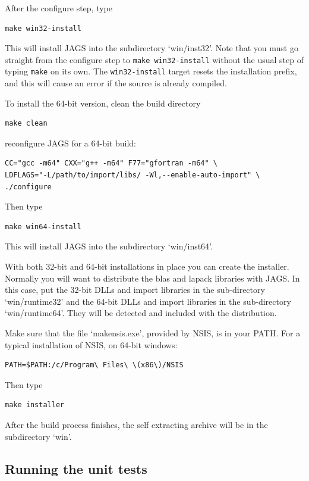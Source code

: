 \documentclass[11pt, a4paper, titlepage]{article}
\newcommand{\file}[1]{{`\normalfont\textsf{#1}'}}
\begin{document}
After the configure step, type
\begin{verbatim}
make win32-install
\end{verbatim}
This will install JAGS into the subdirectory \file{win/inst32}.
Note that you must go straight from the configure step to \texttt{make
  win32-install} without the usual step of typing \texttt{make} on
its own.  The \texttt{win32-install} target resets the installation
prefix, and this will cause an error if the source is already
compiled.

To install the 64-bit version, clean the build directory 
\begin{verbatim}
make clean 
\end{verbatim}
reconfigure JAGS for a 64-bit build:
\begin{verbatim}
CC="gcc -m64" CXX="g++ -m64" F77="gfortran -m64" \
LDFLAGS="-L/path/to/import/libs/ -Wl,--enable-auto-import" \
./configure
\end{verbatim}
Then type
\begin{verbatim}
make win64-install
\end{verbatim}
This will install JAGS into the subdirectory \file{win/inst64}.

With both 32-bit and 64-bit installations in place you can create the
installer.  Normally you will want to distribute the blas and lapack
libraries with JAGS.  In this case, put the 32-bit DLLs and import
libraries in the sub-directory \file{win/runtime32} and the 64-bit
DLLs and import libraries in the sub-directory
\file{win/runtime64}. They will be detected and included with the
distribution.

Make sure that the file \file{makensis.exe}, provided by
NSIS, is in your PATH. For a typical installation of NSIS, on 64-bit
windows:
\begin{verbatim}
PATH=$PATH:/c/Program\ Files\ \(x86\)/NSIS
\end{verbatim}
Then type
\begin{verbatim}
make installer
\end{verbatim}
After the build process finishes, the self extracting archive will be
in the subdirectory \file{win}.

\subsection{Running the unit tests}
\end{document}
